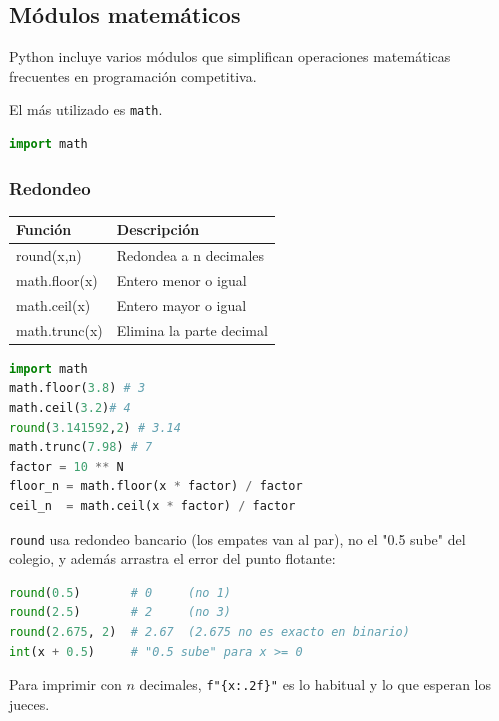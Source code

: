 \subsection{Módulos matemáticos}
\label{alg:2-5}

Python incluye varios módulos que simplifican operaciones matemáticas frecuentes en programación competitiva.

El más utilizado es \texttt{math}.

\begin{lstlisting}[language=Python]
import math
\end{lstlisting}

\vspace{0.3cm}

\subsubsection{Redondeo}

\begin{center}
\begin{tabular}{|l|l|}
\hline
Función & Descripción \\ \hline
round(x,n) & Redondea a n decimales \\ \hline
math.floor(x) & Entero menor o igual \\ \hline
math.ceil(x) & Entero mayor o igual \\ \hline
math.trunc(x) & Elimina la parte decimal \\ \hline
\end{tabular}
\end{center}

\begin{lstlisting}[language=Python]
import math
math.floor(3.8) # 3
math.ceil(3.2)# 4
round(3.141592,2) # 3.14
math.trunc(7.98) # 7
factor = 10 ** N
floor_n = math.floor(x * factor) / factor
ceil_n  = math.ceil(x * factor) / factor
\end{lstlisting}

 \texttt{round} usa redondeo bancario (los empates van al par),
no el "0.5 sube" del colegio, y además arrastra el error del punto flotante:

\begin{lstlisting}[language=Python]
round(0.5)       # 0     (no 1)
round(2.5)       # 2     (no 3)
round(2.675, 2)  # 2.67  (2.675 no es exacto en binario)
int(x + 0.5)     # "0.5 sube" para x >= 0
\end{lstlisting}

Para imprimir con $n$ decimales, \texttt{f"\{x:.2f\}"} es lo habitual y lo que
esperan los jueces.

